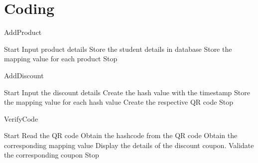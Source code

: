 \chapter{Coding}

\begin{algorithm}
\begin{algorithmic}[1]
\caption{AddProduct}
\State Start
\State Input product details
\State Store the student details in database
\State Store the mapping value for each product
\State Stop
\end{algorithmic}
\end{algorithm}

\begin{algorithm}
\begin{algorithmic}[1]
\caption{AddDiscount}
\State Start
\State Input the discount details
\State Create the hash value with the timestamp
\State Store the mapping value for each hash value 
\State Create the respective QR code 
\State Stop
\end{algorithmic}
\end{algorithm}

\begin{algorithm}
\begin{algorithmic}[1]
\caption{VerifyCode}
\State Start
\State Read the QR code 
\State Obtain the hashcode from the QR code
\State Obtain the corresponding mapping value 
\State Display the details of the discount coupon.
\State Validate the corresponding coupon
\State Stop
\end{algorithmic}
\end{algorithm}

